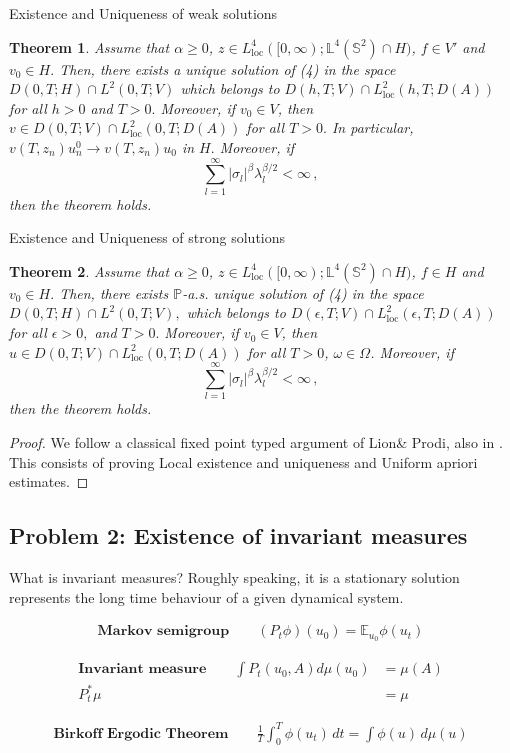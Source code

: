 \documentclass[xcolor=dvipsnames,leqno]{beamer}
\renewcommand{\P}{\mathbb{P}}
\newcommand{\E}{\mathbb{E}}
\newtheorem{thm}{Theorem}
\begin{document}
\begin{frame}{Existence and Uniqueness of weak solutions}
	\begin{thm}
	Assume that $\alpha\ge 0$, $ z\in L^4_{\text{loc}}([0,\infty);\mathbb{L}^4(\mathbb{S}^2)\cap H)$, {\color{red}$ f\in V'$} and $ v_0\in H.$ Then, there exists a unique solution of (4) in the space $D(0,T;H)\cap L^2(0,T;V)$ which belongs to $D(h,T; V)\cap L^2_{\text{loc}}(h,T;D(A))$ for all $h>0$ and $T>0.$ Moreover, if $ v_0\in V$, then $ v\in D(0,T; V)\cap L^2_{\text{loc}}(0,T;D(A))$ for all $T>0.$ In particular, $ v(T,z_n) u^0_n\to  v(T,z_n) u_0$ in $H.$ Moreover, if
	\[\sum_{l=1}^\infty|\sigma_l|^{\beta}\lambda^{\beta/2}_l<\infty\,,\]
	then the theorem holds.
\end{thm}
\end{frame}
\begin{frame}{Existence and Uniqueness of strong solutions}
	\begin{thm}
		Assume that $\alpha\ge 0$, $z\in L^4_{\text{loc}}([0,\infty);\mathbb{L}^4(\mathbb{S}^2)\cap H)$, {\color{red}$ f\in H$} and $ v_0\in H.$ Then, there exists  $\P$-a.s. unique solution of (4) in the space $D(0,T;H)\cap L^2(0,T;V),$ which belongs to $D(\epsilon,T; V)\cap L^2_{\text{loc}}(\epsilon,T;D(A))$ for all $\epsilon>0,$ and $T>0.$ Moreover, if $ v_0\in V$, then $ u\in D(0,T; V)\cap L^2_{\text{loc}}(0,T;D(A))$ for all $T>0$, $\omega\in\Omega$. Moreover, if
	\[\sum_{l=1}^\infty|\sigma_l|^{\beta}\lambda^{\beta/2}_l<\infty\,,\]
	then the theorem holds.
	\end{thm}
\begin{proof}
	We follow a classical fixed point typed argument of Lion\& Prodi, also in \cite{MR1207308}. This consists of proving {\color{red}Local existence and uniqueness} and {\color{red}Uniform apriori estimates}.
\end{proof}
\end{frame}
 

\subsection{Problem 2: Existence of invariant measures}

\begin{frame}{What is invariant measures?}
	Roughly speaking, it is a stationary solution represents the long time behaviour of a given dynamical system. 

\begin{align*}
\textbf{Markov semigroup}\qquad (P_t\phi)(u_0) = \E_{u_0}\phi(u_t)
\end{align*}

\begin{align*}
\textbf{Invariant measure}\qquad	\int P_t(u_0, A)d\mu(u_0)&=\mu(A)\\ 
P^*_t\mu &= \mu 
\end{align*}

\begin{align*}
\textbf{Birkoff Ergodic Theorem}\qquad	\frac{1}{T}\int^T_0\phi(u_t)\,dt =\int \phi(u)\,d\mu(u)
\end{align*}
\end{frame}
\end{document}
